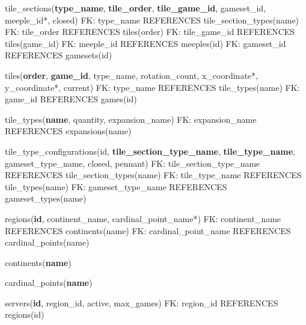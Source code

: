 tile\_sections(\textbf{type\_name}, \textbf{tile\_order}, \textbf{tile\_game\_id}, gameset\_id, meeple\_id*, closed)\newline
FK: type\_name REFERENCES tile\_section\_types(name)\newline
FK: tile\_order REFERENCES tiles(order)\newline
FK: tile\_game\_id REFERENCES tiles(game\_id)\newline
FK: meeple\_id REFERENCES meeples(id)\newline
FK: gameset\_id REFERENCES gamesets(id)\newline

tiles(\textbf{order}, \textbf{game\_id}, type\_name, rotation\_count, x\_coordinate*, y\_coordinate*, current)\newline
FK: type\_name REFERENCES tile\_types(name)\newline
FK: game\_id REFERENCES games(id)\newline

tile\_types(\textbf{name}, quantity, expansion\_name)\newline
FK: expansion\_name REFERENCES expansions(name)\newline

tile\_type\_configurations(id, \textbf{tile\_section\_type\_name}, \textbf{tile\_type\_name}, gameset\_type\_name, closed, pennant)\newline
FK: tile\_section\_type\_name REFERENCES tile\_section\_types(name)\newline
FK: tile\_type\_name REFERENCES tile\_types(name)\newline
FK: gameset\_type\_name REFERENCES gameset\_types(name)\newline

regions(\textbf{id}, continent\_name, cardinal\_point\_name*)\newline
FK: continent\_name REFERENCES continents(name)\newline
FK: cardinal\_point\_name REFERENCES cardinal\_points(name)\newline

continents(\textbf{name})\newline

cardinal\_points(\textbf{name})\newline

servers(\textbf{id}, region\_id, active, max\_games)\newline
FK: region\_id REFERENCES regions(id)

